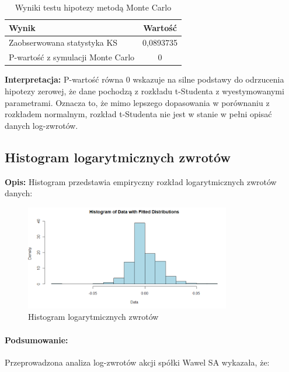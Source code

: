 \documentclass[a4paper,11pt]{article}
\begin{document}
\begin{table}[H]
    \centering
    \begin{tabular}{|p{7cm}|c|}
        \hline
        \textbf{Wynik} & \textbf{Wartość} \\
        \hline
        Zaobserwowana statystyka KS & 0,0893735 \\
        P-wartość z symulacji Monte Carlo & 0 \\
        \hline
    \end{tabular}
    \caption{Wyniki testu hipotezy metodą Monte Carlo}
    \label{tab:test_results}
\end{table}


\textbf{Interpretacja:} P-wartość równa 0 wskazuje na silne podstawy do odrzucenia hipotezy zerowej, że dane pochodzą z rozkładu t-Studenta z wyestymowanymi parametrami. Oznacza to, że mimo lepszego dopasowania w porównaniu z rozkładem normalnym, rozkład t-Studenta nie jest w stanie w pełni opisać danych log-zwrotów.

\subsection*{Histogram logarytmicznych zwrotów}

\textbf{Opis:} Histogram przedstawia empiryczny rozkład logarytmicznych zwrotów danych:

\begin{figure}[H]
    \centering
    \includegraphics[width=0.8\textwidth]{./Wojtek/histogram_log_returns.png}
    \caption{Histogram logarytmicznych zwrotów}
    \label{fig:histogram_log_returns}
\end{figure}

\newpage\paragraph{Podsumowanie:}

Przeprowadzona analiza log-zwrotów akcji spółki Wawel SA wykazała, że:
\end{document}

